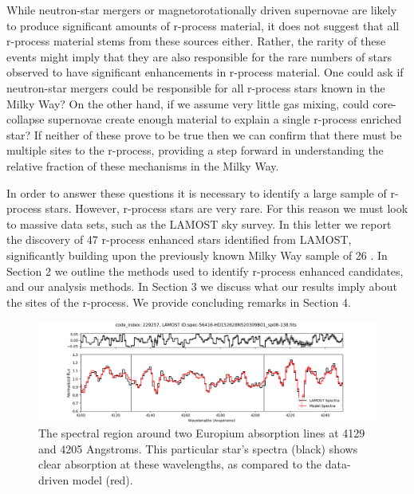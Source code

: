 \documentclass[a4paper,fleqn,usenatbib]{mnras}
\begin{document}
	While neutron-star mergers or magnetorotationally driven supernovae are likely to produce significant amounts of r-process material, it does not suggest that all r-process material stems from these sources either. Rather, the rarity of these events might imply that they are also responsible for the rare numbers of stars  observed to have significant enhancements in r-process material. One could ask if neutron-star mergers could be responsible for all r-process stars known in the Milky Way? On the other hand, if we assume very little gas mixing, could core-collapse supernovae create enough material to explain a single r-process enriched star? If neither of these prove to be true then we can confirm that there must be multiple sites to the r-process, providing a step forward in understanding the relative fraction of these mechanisms in the Milky Way.
	
	In order to answer these questions it is necessary to identify a large sample of r-process stars.
	However, r-process stars are very rare. For this reason we must look to massive data sets, such as the LAMOST sky survey. In this letter we report the discovery of 47 r-process enhanced stars identified from LAMOST, significantly building upon the previously known Milky Way sample of 26 \citep[e.g.,][]{masho2011,Honda2004,Hayek2009,Sneden2003,Ivans2006,Hill2002,Christlieb2004,Wako2010,placo2017,Sakari2018}.
	In Section 2 we outline the methods used to identify r-process enhanced candidates, and our analysis methods. In Section 3 we discuss what our results imply about the sites of the r-process. We provide concluding remarks in Section 4.
	
	
	\begin{figure}
		\includegraphics[width=\textwidth]{229257}
		\caption{The spectral region around two Europium absorption lines at 4129 and 4205 Angstroms. This particular star's spectra (black) shows clear absorption at these wavelengths, as compared to the data-driven model (red).}
		\label{fig:starindex_229257}
	\end{figure}
	
\end{document}
